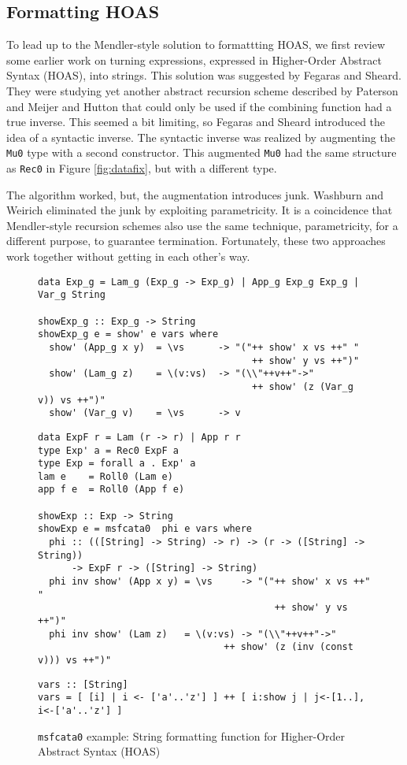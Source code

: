 \documentclass[letterpaper,12pt]{article}
\begin{document}
\subsection{Formatting HOAS} \label{sec:bg:showHOAS}

To lead up to the Mendler-style solution to formattting HOAS,
we first review some earlier work on turning expressions, expressed in 
Higher-Order Abstract Syntax (HOAS)\cite{Church40,PfeEll88}, into strings.
This solution was suggested by Fegaras and Sheard\cite{FegShe96}.
They were studying yet another abstract recursion scheme described by
Paterson\cite{Pat93} and Meijer and Hutton\cite{MeiHut95} that could only be
used if the combining function had a true inverse. This seemed a bit limiting,
so Fegaras and Sheard introduced the idea of a syntactic inverse.
The syntactic inverse was realized by augmenting the \verb|Mu0| type with a second
constructor. This augmented \verb|Mu0| had the same structure as \verb|Rec0|
in Figure \ref{fig:datafix}, but with a different type.

The algorithm worked, but, the augmentation introduces junk.
Washburn and Weirich\cite{bgb} eliminated the junk by exploiting parametricity.
It is a coincidence that Mendler-style recursion schemes also use the same
technique, parametricity, for a different purpose, to guarantee termination.
Fortunately, these two approaches work together without getting in
each other's way.  

\begin{figure}
\begin{verbatim}
data Exp_g = Lam_g (Exp_g -> Exp_g) | App_g Exp_g Exp_g | Var_g String

showExp_g :: Exp_g -> String
showExp_g e = show' e vars where
  show' (App_g x y)  = \vs      -> "("++ show' x vs ++" "
                                      ++ show' y vs ++")"
  show' (Lam_g z)    = \(v:vs)  -> "(\\"++v++"->"
                                      ++ show' (z (Var_g v)) vs ++")"
  show' (Var_g v)    = \vs      -> v
\end{verbatim}
\begin{verbatim}
data ExpF r = Lam (r -> r) | App r r
type Exp' a = Rec0 ExpF a
type Exp = forall a . Exp' a
lam e    = Roll0 (Lam e)
app f e  = Roll0 (App f e)

showExp :: Exp -> String
showExp e = msfcata0  phi e vars where
  phi :: (([String] -> String) -> r) -> (r -> ([String] -> String))
      -> ExpF r -> ([String] -> String)
  phi inv show' (App x y) = \vs     -> "("++ show' x vs ++" "
                                          ++ show' y vs ++")"
  phi inv show' (Lam z)   = \(v:vs) -> "(\\"++v++"->"
                                 ++ show' (z (inv (const v))) vs ++")"
\end{verbatim}
\begin{verbatim}
vars :: [String]
vars = [ [i] | i <- ['a'..'z'] ] ++ [ i:show j | j<-[1..], i<-['a'..'z'] ]
\end{verbatim}
\caption{\texttt{msfcata0} example: String formatting function for Higher-Order Abstract Syntax (HOAS)}
\label{fig:HOASshow}
\end{figure}
\end{document}
